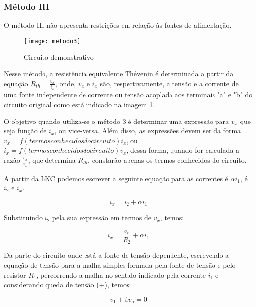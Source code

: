 \documentclass[12pt,fleqn]{book} %
\begin{document}
        \subsubsection{Método III}{        

\begin{remark}
O método III não apresenta restrições em relação às fontes de alimentação.
\end{remark}   

        \begin{figure}[!htbp] \centering\texttt{[image: metodo3]}
            \caption{Circuito demonstrativo}\label{metodo3} 
        \end{figure}
   
Nesse método, a resistência equivalente Thévenin é determinada a partir da equação $R_{th}=\frac{v_x}{i_x}$, onde, $v_x$ e $i_x$ são, respectivamente, a tensão e a corrente de uma fonte independente de corrente ou tensão acoplada aos terminais "a" e "b" do circuito original como está indicado na imagem \ref{metodo3}. 

O objetivo quando utiliza-se o método 3 é determinar uma expressão para $v_x$ que seja função de $i_x$, ou vice-versa. Além disso, as expressões devem ser da forma $v_x=f(termos conhecidos do circuito)i_x$, ou $i_x=f(termos conhecidos do circuito)v_x$, dessa forma, quando for calculada a razão $\frac{v_x}{i_x}$, que determina $R_{th}$, constarão apenas os termos conhecidos do circuito.

A partir da LKC podemos escrever a seguinte equação para as correntes é $\alpha i_1$, é $i_2$ e $i_x$.

\begin{equation}
i_x=i_2+\alpha i_1
\end{equation}

Substituindo $i_2$ pela sua expressão em termos de $v_x$, temos:

\begin{equation}\label{ix}
i_x=\frac{v_x}{R_2} +\alpha i_1
\end{equation}

Da parte do circuito onde está a fonte de tensão dependente, escrevendo a equação de tensão para a malha simples formada pela fonte de tensão e pelo resistor $R_1$, percorrendo a malha no sentido indicado pela corrente $i_1$ e considerando queda de tensão (+), temos:

\begin{equation}
v_1+\beta v_o=0
\end{equation}

}
\end{document}
